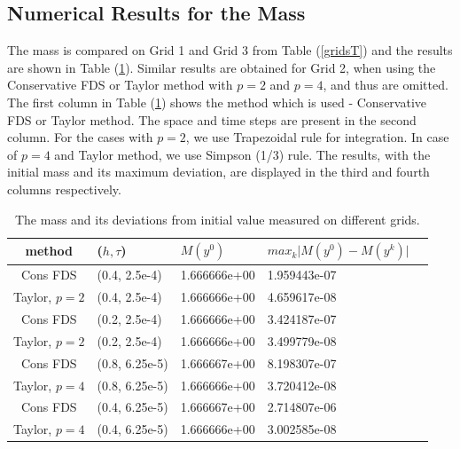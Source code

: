 \documentclass[%
 aip,
cp,  
 amsmath,amssymb,
 reprint,
]{iopconfser}
\newcommand{\rf}[1]{(\ref{#1})}
\begin{document}
\subsection{Numerical Results for the Mass}
The mass is compared on Grid 1 and Grid 3 from Table \rf{gridsT} and the results are shown in Table \rf{tableMass}. Similar results are obtained for Grid 2, when using the Conservative FDS or Taylor method with $p=2$ and $p=4$, and thus are omitted. The first column in Table \rf{tableMass} shows the method which is used - Conservative FDS or Taylor method. The space and time steps are present in the second column. For the cases with $p=2$, we use Trapezoidal rule for integration. In case of $p=4$ and Taylor method, we use Simpson (1/3) rule. The results, with the initial mass and its maximum deviation, are displayed in the third and fourth columns respectively.  
\begin{table}[ht]
\centering
\small
		\begin{tabular}{||c|l|l|l|l||}
			\hline
method        & ($h,\tau$)& $M(y^0)$ &   $max_k \vert M(y^0) - M(y^k) \vert$   \\
   			\hline 
Cons FDS            &  (0.4, 2.5e-4) & 1.666666e+00 &  1.959443e-07                \\
Taylor, $p=2$     &  (0.4, 2.5e-4) & 1.666666e+00 &  4.659617e-08                 \\
Cons FDS            &  (0.2, 2.5e-4) & 1.666666e+00 & 3.424187e-07               \\
Taylor, $p=2$     &  (0.2, 2.5e-4) & 1.666666e+00 & 3.499779e-08                \\
	   		\hline
			\hline
Cons FDS           &  (0.8, 6.25e-5) & 1.666667e+00 & 8.198307e-07                    \\
Taylor, $p=4$     &  (0.8, 6.25e-5) & 1.666666e+00 &  3.720412e-08                      \\
Cons FDS           &  (0.4, 6.25e-5) & 1.666667e+00 &  2.714807e-06                     \\
Taylor, $p=4$    &  (0.4, 6.25e-5) & 1.666666e+00 &  3.002585e-08                      \\
			\hline 
			\hline
		\end{tabular}
		\caption{ The mass and its deviations from initial value measured on different grids. }
\label{tableMass}
\end{table}
\end{document}
